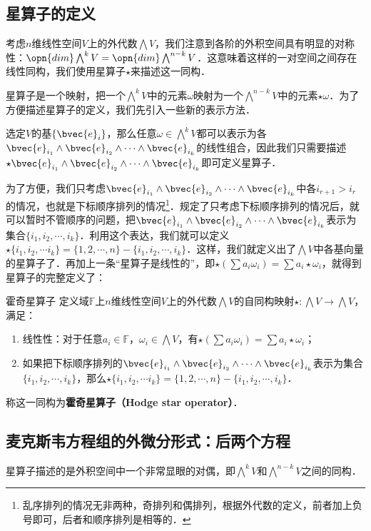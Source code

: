 


\subsection{星算子的定义}

考虑$n$维线性空间$V$上的外代数$\bigwedge V$，我们注意到各阶的外积空间具有明显的对称性：$\opn{dim}\bigwedge^k V=\opn{dim}\bigwedge^{n-k} V$．这意味着这样的一对空间之间存在线性同构，我们使用星算子$\star$来描述这一同构．

星算子是一个映射，把一个$\bigwedge^k V$中的元素$\omega$映射为一个$\bigwedge^{n-k} V$中的元素$\star\omega$．为了方便描述星算子的定义，我们先引入一些新的表示方法．

选定$V$的基$\{\bvec{e}_i\}$，那么任意$\omega\in\bigwedge^k V$都可以表示为各$\bvec{e}_{i_1}\wedge\bvec{e}_{i_2}\wedge\cdots\wedge\bvec{e}_{i_k}$的线性组合，因此我们只需要描述$\star\bvec{e}_{i_1}\wedge\bvec{e}_{i_2}\wedge\cdots\wedge\bvec{e}_{i_k}$即可定义星算子．

为了方便，我们只考虑$\bvec{e}_{i_1}\wedge\bvec{e}_{i_2}\wedge\cdots\wedge\bvec{e}_{i_k}$中各$i_{r+1}>i_r$的情况，也就是下标顺序排列的情况\footnote{乱序排列的情况无非两种，奇排列和偶排列，根据外代数的定义，前者加上负号即可，后者和顺序排列是相等的．}．规定了只考虑下标顺序排列的情况后，就可以暂时不管顺序的问题，把$\bvec{e}_{i_1}\wedge\bvec{e}_{i_2}\wedge\cdots\wedge\bvec{e}_{i_k}$表示为集合$\{i_1, i_2, \cdots, i_k\}$．利用这个表达，我们就可以定义$\star\{i_1, i_2, \cdots i_k\}=\{1, 2, \cdots, n\}-\{i_1, i_2, \cdots, i_k\}$．这样，我们就定义出了$\bigwedge V$中各基向量的星算子了．再加上一条“星算子是线性的”，即$\star(\sum a_i\omega_i)=\sum a_i\star\omega_i$，就得到星算子的完整定义了：

\begin{definition}{霍奇星算子}
定义域$\mathbb{F}$上$n$维线性空间$V$上的外代数$\bigwedge V$的自同构映射$\star:\bigwedge V\to \bigwedge V$，满足：
\begin{enumerate}
\item 线性性：对于任意$a_i\in\mathbb{F}$，$\omega_i\in\bigwedge V$，有$\star(\sum a_i\omega_i)=\sum a_i\star\omega_i$；
\item 如果把下标顺序排列的$\bvec{e}_{i_1}\wedge\bvec{e}_{i_2}\wedge\cdots\wedge\bvec{e}_{i_k}$表示为集合$\{i_1, i_2, \cdots, i_k\}$，那么$\star\{i_1, i_2, \cdots i_k\}=\{1, 2, \cdots, n\}-\{i_1, i_2, \cdots, i_k\}$．
\end{enumerate}
称这一同构为\textbf{霍奇星算子（Hodge star operator）}．
\end{definition}

\subsection{麦克斯韦方程组的外微分形式：后两个方程}

星算子描述的是外积空间中一个非常显眼的对偶，即$\bigwedge^k V$和$\bigwedge^{n-k} V$之间的同构．




